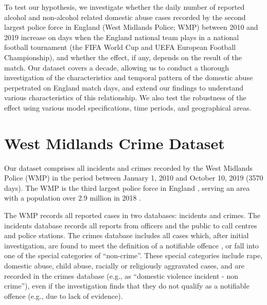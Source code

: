 \documentclass[12pt, a4paper]{article}
\begin{document}
To test our hypothesis, we investigate whether the daily number of reported alcohol and non-alcohol related domestic abuse cases recorded by the second largest police force in England (West Midlands Police; WMP) between 2010 and 2019 increase on days when the England national team plays in a national football tournament (the FIFA World Cup and UEFA European Football Championship), and whether the effect, if any, depends on the result of the match. Our dataset covers a decade, allowing us to conduct a thorough investigation of the characteristics and temporal pattern of the domestic abuse perpetrated on England match days, and extend our findings to understand various characteristics of this relationship. We also test the robustness of the effect using various model specifications, time periods, and geographical areas. 



\section{West Midlands Crime Dataset}


Our dataset comprises all incidents and crimes recorded by the West Midlands Police (WMP) in the period between January 1, 2010 and October 10, 2019 (3570 days). The WMP is the third largest police force in England \cite{Homeoffice}, serving an area with a population over 2.9 million in 2018 \cite{populationfigure}. 

The WMP records all reported cases in two databases: incidents and crimes. The incidents database records all reports from officers and the public to call centres and police stations. The crimes database includes all cases which, after initial investigation, are found to meet the definition of a notifiable offence , or fall into one of the special categories of ``non-crime''. These special categories include rape, domestic abuse, child abuse, racially or religiously aggravated cases, and are recorded in the crimes database (e.g., as ``domestic violence incident - non crime''), even if the investigation finds that they do not qualify as a notifiable offence (e.g., due to lack of evidence).
 
\end{document}
